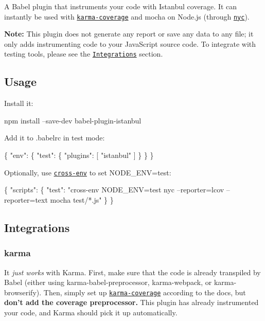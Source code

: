 \href{https://greenkeeper.io/}{\tt } \href{https://travis-ci.org/istanbuljs/babel-plugin-istanbul}{\tt } \href{https://coveralls.io/github/istanbuljs/babel-plugin-istanbul?branch=master}{\tt } \href{https://conventionalcommits.org}{\tt }

A Babel plugin that instruments your code with Istanbul coverage. It can instantly be used with \href{https://github.com/karma-runner/karma-coverage}{\tt karma-\/coverage} and mocha on Node.\+js (through \href{https://github.com/bcoe/nyc}{\tt nyc}).

{\bfseries Note\+:} This plugin does not generate any report or save any data to any file; it only adds instrumenting code to your Java\+Script source code. To integrate with testing tools, please see the \href{#integrations}{\tt Integrations} section.

\subsection*{Usage}

Install it\+:


\begin{DoxyCode}
npm install --save-dev babel-plugin-istanbul
\end{DoxyCode}


Add it to {\ttfamily .babelrc} in test mode\+:


\begin{DoxyCode}
\{
  "env": \{
    "test": \{
      "plugins": [ "istanbul" ]
    \}
  \}
\}
\end{DoxyCode}


Optionally, use \href{https://www.npmjs.com/package/cross-env}{\tt cross-\/env} to set {\ttfamily N\+O\+D\+E\+\_\+\+E\+NV=test}\+:


\begin{DoxyCode}
\{
  "scripts": \{
    "test": "cross-env NODE\_ENV=test nyc --reporter=lcov --reporter=text mocha test/*.js"
  \}
\}
\end{DoxyCode}


\subsection*{Integrations}

\subsubsection*{karma}

It {\itshape just works} with Karma. First, make sure that the code is already transpiled by Babel (either using {\ttfamily karma-\/babel-\/preprocessor}, {\ttfamily karma-\/webpack}, or {\ttfamily karma-\/browserify}). Then, simply set up \href{https://github.com/karma-runner/karma-coverage}{\tt karma-\/coverage} according to the docs, but {\bfseries don’t add the {\ttfamily coverage} preprocessor.} This plugin has already instrumented your code, and Karma should pick it up automatically.

